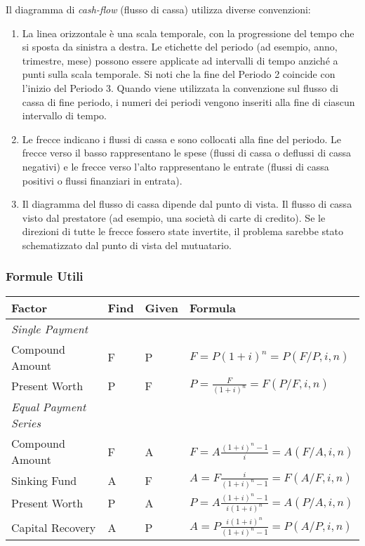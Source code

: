 \documentclass[a4paper,portrait,12pt]{article}
\theoremstyle{definition}
\begin{document}
Il diagramma di \emph{cash-flow} (flusso di cassa) utilizza diverse convenzioni:
\begin{enumerate}
\item La linea orizzontale è una scala temporale, con la progressione del tempo che si sposta da sinistra a destra.
Le etichette del periodo (ad esempio, anno, trimestre, mese) possono essere applicate ad intervalli di tempo anziché a punti sulla scala temporale.
Si noti che la fine del Periodo 2 coincide con l'inizio del Periodo 3.
Quando viene utilizzata la convenzione sul flusso di cassa di fine periodo, i numeri dei periodi vengono inseriti alla fine di ciascun intervallo di tempo.

\item Le frecce indicano i flussi di cassa e sono collocati alla fine del periodo.
Le frecce verso il basso rappresentano le spese (flussi di cassa o deflussi di cassa negativi) e le frecce verso l'alto rappresentano le entrate (flussi di cassa positivi o flussi finanziari in entrata).

\item Il diagramma del flusso di cassa dipende dal punto di vista.
Il flusso di cassa visto dal prestatore (ad esempio, una società di carte di credito).
Se le direzioni di tutte le frecce fossero state invertite, il problema sarebbe stato schematizzato dal punto di vista del mutuatario.
\end{enumerate}

\subsubsection{Formule Utili}

\begin{table}[H]
\begin{center}
\begin{tabular}{llll}
\hline
Factor & Find & Given & Formula\\
\hline
\emph{Single Payment} & &\\
Compound Amount	& F & P & $F = P (1+i)^n = P(F/P, i, n)$\\
Present Worth	& P & F & $P = \frac{F}{(1+i)^n} = F(P/F, i, n)$\\
\hline
\emph{Equal Payment Series} & &\\
Compound Amount	& F & A & $F = A \frac{(1+i)^n -1}{i} = A(F/A, i, n)$\\
Sinking Fund		& A & F & $A = F \frac{i}{(1+i)^n -1} = F(A/F, i, n)$\\
Present Worth	& P & A & $P = A \frac{(1+i)^n -1}{i(1+i)^n} = A(P/A, i, n)$\\
Capital Recovery	& A & P & $A = P \frac{i(1+i)^n}{(1+i)^n-1} = P(A/P, i, n)$
\end{tabular}
\end{center}
\end{table}
\end{document}
